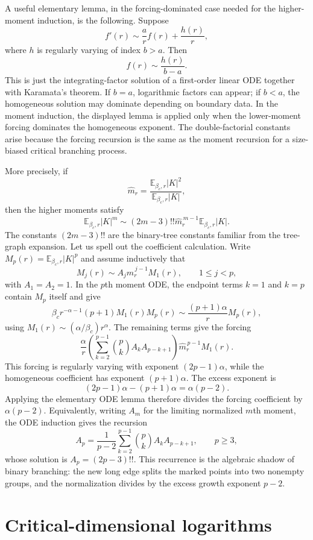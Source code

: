 \documentclass[11pt,reqno]{book}
\numberwithin{equation}{chapter}
\theoremstyle{plain}
\theoremstyle{definition}
\theoremstyle{remark}
\newcommand{\1}{\mathbf 1}
\begin{document}
A useful elementary lemma, in the forcing-dominated case needed for the higher-moment induction, is the following. Suppose
\[
  f'(r)\sim \frac a r f(r)+\frac{h(r)}r,
\]
where $h$ is regularly varying of index $b>a$. Then
\[
  f(r)\sim \frac{h(r)}{b-a}.
\]
This is just the integrating-factor solution of a first-order linear ODE together with Karamata's theorem. If $b=a$, logarithmic factors can appear; if $b<a$, the homogeneous solution may dominate depending on boundary data. In the moment induction, the displayed lemma is applied only when the lower-moment forcing dominates the homogeneous exponent. The double-factorial constants arise because the forcing recursion is the same as the moment recursion for a size-biased critical branching process.

More precisely, if
\[
  \widehat m_r=
  \frac{\mathbb E_{\beta_c,r}|K|^2}
       {\mathbb E_{\beta_c,r}|K|},
\]
then the higher moments satisfy
\[
  \mathbb E_{\beta_c,r}|K|^m
  \sim
  (2m-3)!!
  \widehat m_r^{\,m-1}
  \mathbb E_{\beta_c,r}|K|.
\]
The constants $(2m-3)!!$ are the binary-tree constants familiar from the tree-graph expansion.
Let us spell out the coefficient calculation. Write \(M_p(r)=\mathbb E_{\beta_c,r}|K|^p\) and assume inductively that
\[
  M_j(r)\sim A_j\widehat m_r^{\,j-1}M_1(r),
  \qquad 1\leq j<p,
\]
with \(A_1=A_2=1\). In the \(p\)th moment ODE, the endpoint terms \(k=1\)
and \(k=p\) contain \(M_p\) itself and give
\[
  \beta_c r^{-\alpha-1}(p+1)M_1(r)M_p(r)
  \sim
  \frac{(p+1)\alpha}{r}M_p(r),
\]
using \(M_1(r)\sim(\alpha/\beta_c)r^\alpha\). The remaining terms give the
forcing
\[
  \frac{\alpha}{r}
  \left(
    \sum_{k=2}^{p-1}
    \binom pk A_kA_{p-k+1}
  \right)
  \widehat m_r^{\,p-1}M_1(r).
\]
This forcing is regularly varying with exponent \((2p-1)\alpha\), while the
homogeneous coefficient has exponent \((p+1)\alpha\). The excess exponent is
\[
  (2p-1)\alpha-(p+1)\alpha=\alpha(p-2).
\]
Applying the elementary ODE lemma therefore divides the forcing coefficient
by \(\alpha(p-2)\). Equivalently, writing \(A_m\) for the limiting normalized
\(m\)th moment, the ODE induction gives the recursion
\[
  A_p
  =
  \frac1{p-2}
  \sum_{k=2}^{p-1}
  \binom pk A_kA_{p-k+1},
  \qquad p\geq3,
\]
whose solution is \(A_p=(2p-3)!!\). This recurrence is the algebraic shadow of binary branching: the new long edge splits the marked points into two nonempty groups, and the normalization divides by the excess growth exponent \(p-2\).

\section{Critical-dimensional logarithms}
\end{document}
